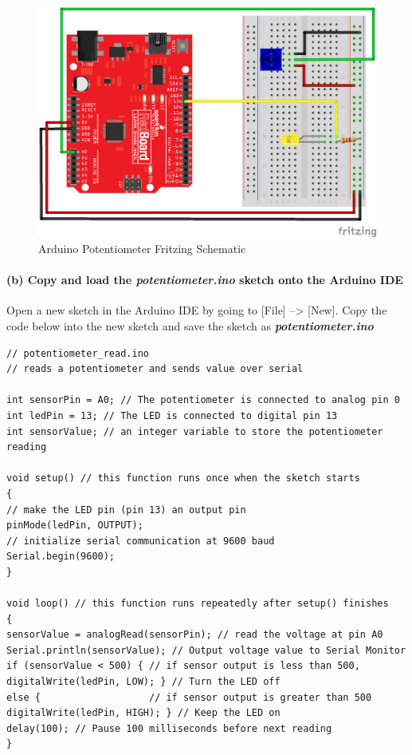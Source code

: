 \documentclass[11pt]{article}
\begin{document}
\begin{figure}
\centering
\includegraphics{images/redboard_pot_led_fritzing.png}
\caption{Arduino Potentiometer Fritzing Schematic}
\end{figure}

    \hypertarget{b-copy-and-load-the-potentiometer.ino-sketch-onto-the-arduino-ide}{%
\paragraph{\texorpdfstring{(b) Copy and load the
\textbf{\emph{potentiometer.ino}} sketch onto the Arduino
IDE}{(b) Copy and load the potentiometer.ino sketch onto the Arduino IDE}}\label{b-copy-and-load-the-potentiometer.ino-sketch-onto-the-arduino-ide}}

Open a new sketch in the Arduino IDE by going to {[}File{]}
--\textgreater{} {[}New{]}. Copy the code below into the new sketch and
save the sketch as \textbf{\emph{potentiometer.ino}}

\begin{verbatim}
// potentiometer_read.ino
// reads a potentiometer and sends value over serial

int sensorPin = A0; // The potentiometer is connected to analog pin 0
int ledPin = 13; // The LED is connected to digital pin 13
int sensorValue; // an integer variable to store the potentiometer reading

void setup() // this function runs once when the sketch starts
{
// make the LED pin (pin 13) an output pin
pinMode(ledPin, OUTPUT);
// initialize serial communication at 9600 baud
Serial.begin(9600);
}

void loop() // this function runs repeatedly after setup() finishes
{
sensorValue = analogRead(sensorPin); // read the voltage at pin A0
Serial.println(sensorValue); // Output voltage value to Serial Monitor
if (sensorValue < 500) { // if sensor output is less than 500,
digitalWrite(ledPin, LOW); } // Turn the LED off
else {                   // if sensor output is greater than 500
digitalWrite(ledPin, HIGH); } // Keep the LED on
delay(100); // Pause 100 milliseconds before next reading
}
\end{verbatim}
\end{document}

